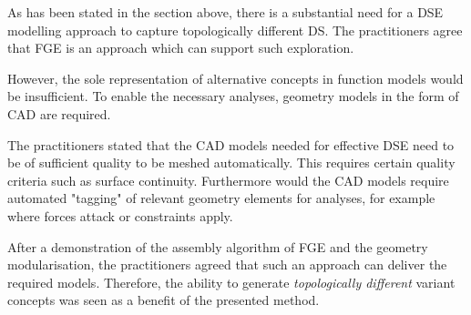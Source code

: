 \documentclass[aerospace,article,submit,moreauthors,pdftex]{Definitions/mdpi}
\begin{document}
As has been stated in the section above, there is a substantial need for a \ac{DSE} modelling approach to capture topologically different \ac{DS}.
The practitioners agree that \ac{FGE} is an approach which can support such exploration.

However, the sole representation of alternative concepts in function models would be insufficient.
To enable the necessary analyses, geometry models in the form of CAD are required.

The practitioners stated that the CAD models needed for effective \ac{DSE} need to be of sufficient quality to be meshed automatically.
This requires certain quality criteria such as surface continuity.
Furthermore would the CAD models require automated "tagging" of relevant geometry elements for analyses, for example where forces attack or constraints apply.


After a demonstration of the assembly algorithm of FGE and the geometry modularisation, the practitioners agreed that such an approach can deliver the required models.
Therefore, the ability to generate \textit{topologically different} variant concepts was seen as a benefit of the presented method.



\end{document}
